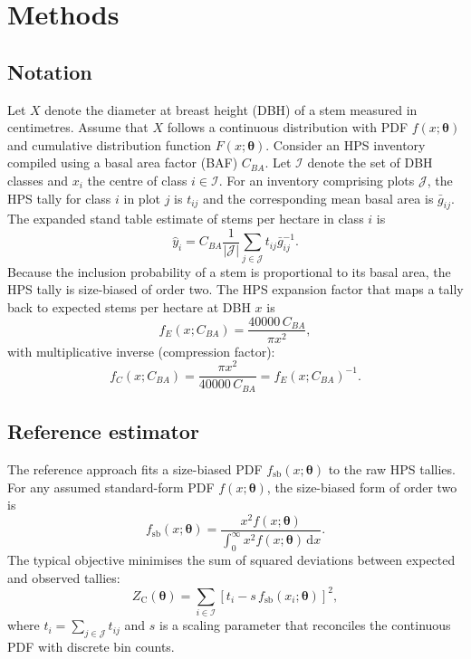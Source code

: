 \section{Methods}

\subsection{Notation}
Let $X$ denote the diameter at breast height (DBH) of a stem measured in
centimetres. Assume that $X$ follows a continuous distribution with PDF
$f(x;\boldsymbol{\theta})$ and cumulative distribution function
$F(x;\boldsymbol{\theta})$. Consider an HPS inventory compiled using a basal
area factor (BAF) $C_{BA}$. Let $\mathcal{I}$ denote the set of DBH classes and
$x_i$ the centre of class $i \in \mathcal{I}$. For an inventory comprising
plots $\mathcal{J}$, the HPS tally for class $i$ in plot $j$ is $t_{ij}$ and
the corresponding mean basal area is $\bar{g}_{ij}$. The expanded stand table
estimate of stems per hectare in class $i$ is
\begin{equation}
  \hat{y}_i = C_{BA} \frac{1}{|\mathcal{J}|} \sum_{j \in \mathcal{J}} t_{ij} \bar{g}_{ij}^{-1}.
  \label{eq:stand-table}
\end{equation}
Because the inclusion probability of a stem is proportional to its basal area,
the HPS tally is size-biased of order two. The HPS expansion factor that maps a
tally back to expected stems per hectare at DBH $x$ is
\begin{equation}
  f_E(x; C_{BA}) = \frac{40000 \, C_{BA}}{\pi x^2},
  \label{eq:expansion}
\end{equation}
with multiplicative inverse (compression factor):
\begin{equation}
  f_C(x; C_{BA}) = \frac{\pi x^2}{40000 \, C_{BA}} = f_E(x; C_{BA})^{-1}.
  \label{eq:compression}
\end{equation}

\subsection{Reference estimator}
The reference approach \citep{van1986, ducey2015} fits a size-biased PDF
$f_{\text{sb}}(x; \boldsymbol{\theta})$ to the raw HPS tallies. For any assumed
standard-form PDF $f(x; \boldsymbol{\theta})$, the size-biased form of order
two is
\begin{equation}
  f_{\text{sb}}(x; \boldsymbol{\theta}) =
  \frac{x^2 f(x; \boldsymbol{\theta})}{\int_0^\infty x^2 f(x; \boldsymbol{\theta}) \, \mathrm{d}x}.
  \label{eq:size-biased}
\end{equation}
The typical objective minimises the sum of squared deviations between expected
and observed tallies:
\begin{equation}
  Z_{\text{C}}(\boldsymbol{\theta}) =
  \sum_{i \in \mathcal{I}} \left[t_i - s \, f_{\text{sb}}(x_i; \boldsymbol{\theta})\right]^2,
  \label{eq:control-obj}
\end{equation}
where $t_i = \sum_{j \in \mathcal{J}} t_{ij}$ and $s$ is a scaling parameter
that reconciles the continuous PDF with discrete bin counts.


